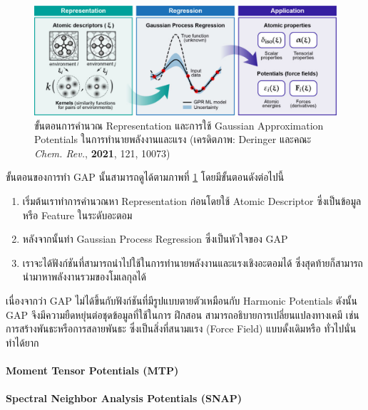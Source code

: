 \begin{figure}[htbp]
    \centering
    \includegraphics[width=\linewidth]{fig/gap_procedure.jpeg}
    \caption{ขั้นตอนการคำนวณ Representation และการใช้ Gaussian Approximation Potentials ในการทำนายพลังงานและแรง
    (เครดิตภาพ: Deringer และคณะ \textit{Chem. Rev.}, \textbf{2021}, 121, 10073\autocite{deringer2019})}
    \label{fig:gap_procedure}
\end{figure}

ขั้นตอนของการทำ GAP นั้นสามารถดูได้ตามภาพที่ \ref{fig:gap_procedure} โดยมีขั้นตอนดังต่อไปนี้
\begin{enumerate}
    \item เริ่มต้นเราทำการคำนวณหา Representation ก่อนโดยใช้ Atomic Descriptor ซึ่งเป็นข้อมูลหรือ Feature ในระดับอะตอม
    \item หลังจากนั้นทำ Gaussian Process Regression ซึ่งเป็นหัวใจของ GAP
    \item เราจะได้ฟังก์ชันที่สามารถนำไปใช้ในการทำนายพลังงานและแรงเชิงอะตอมได้ ซึ่งสุดท้ายก็สามารถนำมาหาพลังงานรวมของโมเลกุลได้
\end{enumerate}

เนื่องจากว่า GAP ไม่ได้ขึ้นกับฟังก์ชันที่มีรูปแบบตายตัวเหมือนกับ Harmonic Potentials ดังนั้น GAP จึงมีความยืดหยุ่นต่อชุดข้อมูลที่ใช้ในการ%
ฝึกสอน สามารถอธิบายการเปลี่ยนแปลงทางเคมี เช่น การสร้างพันธะหรือการสลายพันธะ ซึ่งเป็นสิ่งที่สนามแรง (Force Field) แบบดั้งเดิมหรือ%
ทั่วไปนั่นทำได้ยาก

\paragraph{Moment Tensor Potentials (MTP)}
\autocite{shapeev2016}
    
\paragraph{Spectral Neighbor Analysis Potentials (SNAP)} 
\autocite{thompson2015,deng2019,cusentino2020,domina2022}

